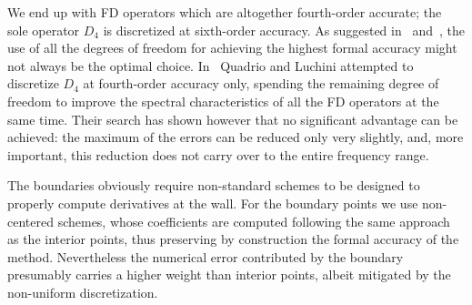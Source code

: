 We end up with FD operators which are altogether fourth-order accurate; the sole operator $D_{4}$ is discretized at sixth-order accuracy. As suggested in~\cite{kim_moin_moser} and~\cite{compact:difference}, the use of all the degrees of freedom for achieving the highest formal accuracy might not always be the optimal choice. In~\cite{ns:quadrio} Quadrio and Luchini attempted to discretize $D_{4}$ at fourth-order accuracy only, spending the remaining degree of freedom to improve the spectral characteristics of all the FD operators at the same time. Their search has shown however that no significant advantage can be achieved: the maximum of the errors can be reduced only very slightly, and, more important, this reduction does not carry over to the entire frequency range.\par
The boundaries obviously require non-standard schemes to be designed to properly compute derivatives at the wall. For the boundary points we use non-centered schemes, whose coefficients are computed following the same approach as the interior points, thus preserving by construction the formal accuracy of the method. Nevertheless the numerical error contributed by the boundary presumably carries a higher weight than interior points, albeit mitigated by the non-uniform discretization. 
